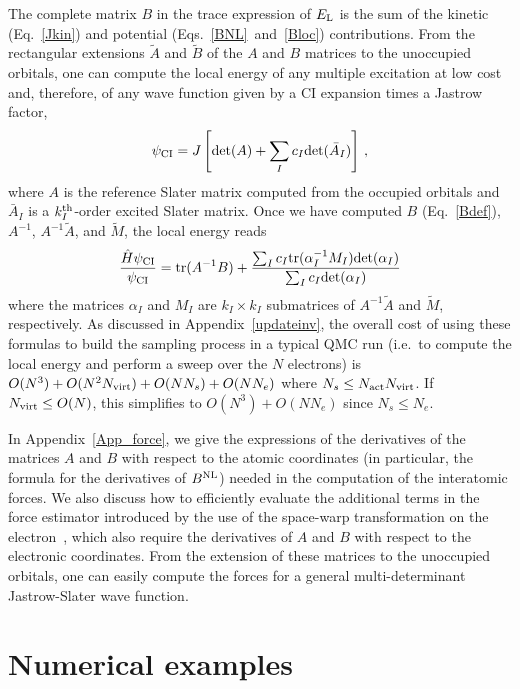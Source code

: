 \documentclass[aip,jcp,reprint,floatfix,onecolumn]{revtex4-1}
\def\det{\text{det}}
\def\tr{\text{tr}}
\begin{document}
The complete matrix $B$ in the trace expression of $E_{\rm L}$ is the sum of the kinetic (Eq.~\ref{Jkin}) and potential (Eqs.~\ref{BNL}~and~\ref{Bloc}) contributions.
From the rectangular extensions $\tilde{A}$ and $\tilde{B}$ of the $A$ and $B$ matrices to the unoccupied orbitals, one can compute the local energy of any multiple excitation at low cost and, therefore, of any wave function given by a CI expansion times a Jastrow factor,
\begin{equation}
\psi_{\rm CI} = J \left[\det (A) + \sum_I c_I \det (\bar{A}_I)\right]\,,
\end{equation}
where $A$ is the reference Slater matrix computed from the occupied orbitals and $\bar{A}_I$ is a $k_I^{\rm th}$-order excited Slater matrix.
Once we have computed $B$ (Eq.~\ref{Bdef}), $A^{-1}$, $A^{-1}\tilde{A}$,  and $\tilde{M}$, the local energy reads
\begin{eqnarray}
\frac{\hat{H}\psi_{\rm CI}}{\psi_{\rm CI}} = \tr (A^{-1}B) + \frac {\sum_I c_I \tr (\alpha_I^{-1} M_I) \det (\alpha_I)}{\sum_I c_I \det(\alpha_I)}
\end{eqnarray}
where the matrices $\alpha_I$ and $M_I$ are $k_I \times k_I$ submatrices of $A^{-1}\tilde{A}$ and $\tilde{M}$, respectively.
As discussed in Appendix~\ref{updateinv}, the overall cost of using these formulas to build the sampling process in a typical QMC run
(i.e.\ to compute the local energy and perform a sweep over the $N$ electrons)
is $O(N^3) + O(N^2 N_{\rm virt})+ O (N N_s) + O(N N_e)$ where $N_s\leq N_{\rm act}N_{\rm virt}$.
If $N_{\rm virt} \leq O(N)$, this simplifies to  $O(N^3) + O (N N_e)$ since $N_s \leq N_e$.

In Appendix~\ref{App_force}, we give the expressions of the derivatives of the matrices $A$ and $B$ with respect to the atomic coordinates (in particular, the formula for the derivatives of $B^{\rm NL}$) needed in the computation of the interatomic forces. We also discuss how to efficiently evaluate the additional terms in the force estimator introduced by the use of the space-warp transformation on the electron~\cite{Umrigar89,Filippi00}, which also require the derivatives of $A$ and $B$ with respect to the electronic coordinates. From the extension of these matrices to the unoccupied orbitals, one can easily compute the forces for a general multi-determinant Jastrow-Slater wave function.


\section{Numerical examples}
\label{numexe}
\end{document}
